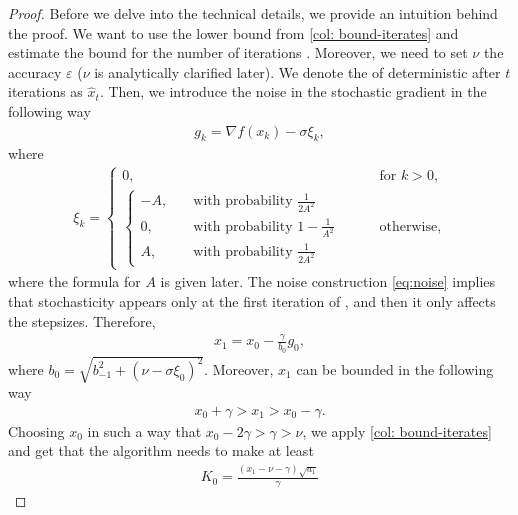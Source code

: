 \documentclass{article}
\begin{document}
\begin{proof}
    Before we delve into the technical details, we provide an intuition behind the proof. We want to use the lower bound from \cref{col: bound-iterates} and estimate the bound for the number of iterations . Moreover, we need to set $\nu$  the accuracy $\varepsilon$ ($\nu$ is analytically clarified later). We denote the  of deterministic  after $t$ iterations as $\hat{x}_t$. Then, we introduce the noise in the stochastic gradient in the following way
    \begin{align*}
        g_k = \nabla f(x_k) - \sigma \xi_k,
    \end{align*}
    where
    \begin{align}
        \label{eq:noise}
        \xi_k = \begin{cases}
            0, \qquad &\text{for } k > 0 ,\\
            \begin{cases}
                -A, &\quad \text{with probability } \frac{1}{2A^2}\\
                0, &\quad \text{with probability } 1 - \frac{1}{A^2}\\
                A, &\quad \text{with probability } \frac{1}{2A^2}
            \end{cases}
            \qquad &\text{otherwise,}
        \end{cases}
    \end{align}
    where the formula for $A$ is given later. The noise construction \eqref{eq:noise} implies that stochasticity appears only at the first iteration of , and then it only affects the stepsizes. Therefore,
    \begin{align*}
        x_1 = x_0 - \frac{\gamma}{b_0}g_0,
    \end{align*}
    where $b_0 = \sqrt{b_{-1}^2 + (\nu - \sigma \xi_0)^2}$. Moreover, $x_1$ can be bounded in the following way
    \begin{align*}
       x_0 + \gamma >  x_1 > x_0 - \gamma.
    \end{align*}
    Choosing $x_0$ in such a way that $x_0 - 2\gamma > \gamma > \nu$, we apply \cref{col: bound-iterates} and get that the algorithm needs to make at least 
    \begin{align*}
        K_0 = \frac{(x_1 - \nu - \gamma)\sqrt{a_1}}{\gamma} 
    \end{align*}

\end{proof}
\end{document}
